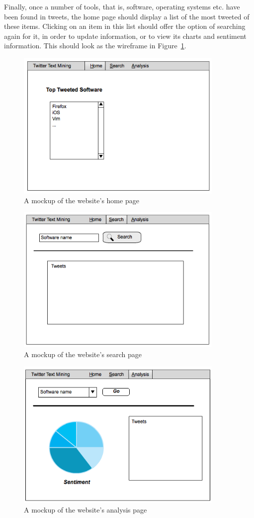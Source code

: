 Finally, once a number of tools, that is, software, operating systems etc. have been found in tweets, the home page should display a list of the most tweeted of these items. Clicking on an item in this list should offer the option of searching again for it, in order to update information, or to view its charts and sentiment information. This should look as the wireframe in Figure~\ref{fig:guiwire1}.

\begin{figure}[h]
\begin{center}
\includegraphics[width=10cm]{guiwire1}
\end{center}
\caption{A mockup of the website's home page}
\label{fig:guiwire1}
\end{figure}

\begin{figure}[h]
\begin{center}
\includegraphics[width=10cm]{guiwire2}
\end{center}
\caption{A mockup of the website's search page}
\label{fig:guiwire2}
\end{figure}

\begin{figure}[h]
\begin{center}
\includegraphics[width=10cm]{guiwire3}
\end{center}
\caption{A mockup of the website's analysis page}
\label{fig:guiwire3}
\end{figure}

